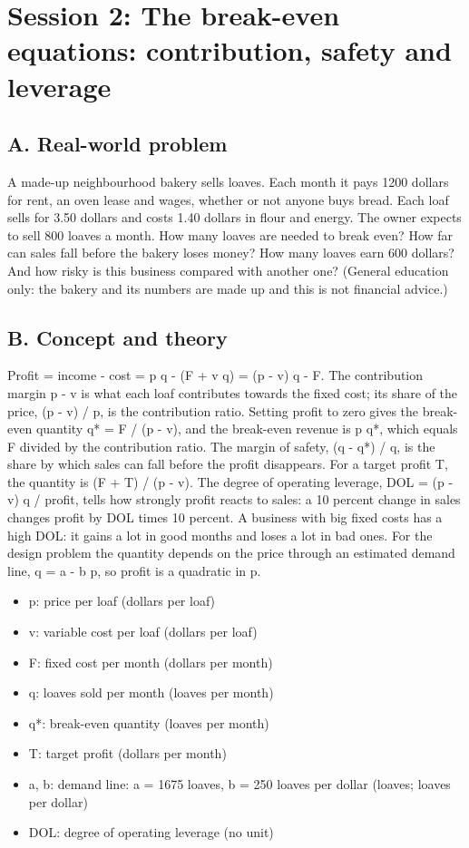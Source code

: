 \documentclass[11pt,a4paper]{article}
\begin{document}
\section{Session 2: The break-even equations: contribution, safety and leverage}

\subsection*{A. Real-world problem}
A made-up neighbourhood bakery sells loaves. Each month it pays 1200 dollars for rent, an oven lease and wages, whether or not anyone buys bread. Each loaf sells for 3.50 dollars and costs 1.40 dollars in flour and energy. The owner expects to sell 800 loaves a month. How many loaves are needed to break even? How far can sales fall before the bakery loses money? How many loaves earn 600 dollars? And how risky is this business compared with another one? (General education only: the bakery and its numbers are made up and this is not financial advice.)

\subsection*{B. Concept and theory}
Profit = income - cost = p q - (F + v q) = (p - v) q - F. The contribution margin p - v is what each loaf contributes towards the fixed cost; its share of the price, (p - v) / p, is the contribution ratio. Setting profit to zero gives the break-even quantity q* = F / (p - v), and the break-even revenue is p q*, which equals F divided by the contribution ratio. The margin of safety, (q - q*) / q, is the share by which sales can fall before the profit disappears. For a target profit T, the quantity is (F + T) / (p - v). The degree of operating leverage, DOL = (p - v) q / profit, tells how strongly profit reacts to sales: a 10 percent change in sales changes profit by DOL times 10 percent. A business with big fixed costs has a high DOL: it gains a lot in good months and loses a lot in bad ones. For the design problem the quantity depends on the price through an estimated demand line, q = a - b p, so profit is a quadratic in p.

\begin{itemize}[nosep]
\item p: price per loaf (dollars per loaf)
\item v: variable cost per loaf (dollars per loaf)
\item F: fixed cost per month (dollars per month)
\item q: loaves sold per month (loaves per month)
\item q*: break-even quantity (loaves per month)
\item T: target profit (dollars per month)
\item a, b: demand line: a = 1675 loaves, b = 250 loaves per dollar (loaves; loaves per dollar)
\item DOL: degree of operating leverage (no unit)
\end{itemize}
\end{document}
